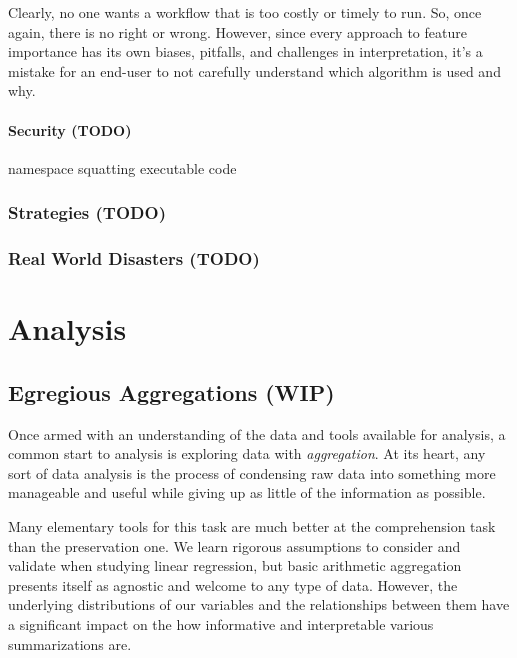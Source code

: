 \documentclass[
]{krantz}
\begin{document}
Clearly, no one wants a workflow that is too costly or timely to run. So, once again, there is no right or wrong. However, since every approach to feature importance has its own biases, pitfalls, and challenges in interpretation, it's a mistake for an end-user to not carefully understand which algorithm is used and why.

\hypertarget{security-todo}{%
\subsection{Security (TODO)}\label{security-todo}}

namespace squatting
executable code

\hypertarget{strategies-todo-1}{%
\section{Strategies (TODO)}\label{strategies-todo-1}}

\hypertarget{real-world-disasters-todo-1}{%
\section{Real World Disasters (TODO)}\label{real-world-disasters-todo-1}}

\hypertarget{part-analysis}{%
\part*{Analysis}\label{part-analysis}}


\hypertarget{eg-agg}{%
\chapter{Egregious Aggregations (WIP)}\label{eg-agg}}

Once armed with an understanding of the data and tools available for analysis, a common start to analysis is exploring data with \emph{aggregation}.
At its heart, any sort of data analysis is the process of condensing raw data into something more manageable and useful while giving up as little of the information as possible.

Many elementary tools for this task are much better at the comprehension task than the preservation one.
We learn rigorous assumptions to consider and validate when studying linear regression, but basic arithmetic aggregation presents itself as agnostic and welcome to any type of data.
However, the underlying distributions of our variables and the relationships between them have a significant impact on the how informative and interpretable various summarizations are.
\end{document}
